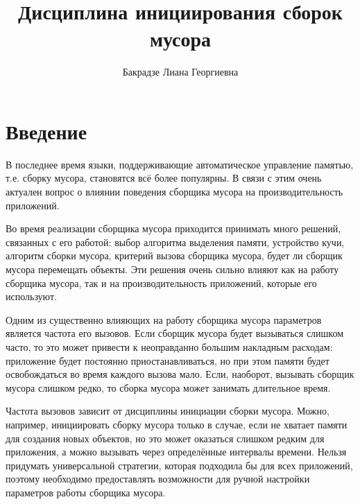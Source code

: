 \title{Дисциплина инициирования сборок мусора}
%
\author{Бакрадзе Лиана Георгиевна}
%
%

%
%

\maketitle              %

\begin{abstract}
\end{abstract}
%

\section*{Введение}

В последнее время языки, поддерживающие автоматическое управление памятью, т.е. сборку 
мусора, становятся всё более популярны. В связи с этим очень актуален вопрос о влиянии
поведения сборщика мусора на производительность приложений.

Во время реализации сборщика мусора приходится принимать много решений,
связанных с его работой: выбор алгоритма выделения памяти, устройство кучи, 
алгоритм сборки мусора, критерий вызова сборщика мусора, будет ли сборщик мусора 
перемещать объекты. Эти решения очень сильно влияют как на работу сборщика мусора, 
так и на
производительность приложений, которые его используют.

Одним из существенно влияющих на работу сборщика мусора параметров
является частота его вызовов. Если 
сборщик мусора будет вызываться слишком часто, то это может привести к неоправданно
большим накладным расходам: приложение будет постоянно приостанавливаться, но при 
этом памяти будет освобождаться во время каждого вызова мало. Если, наоборот, вызывать 
сборщик мусора слишком редко, то сборка мусора может занимать длительное время. 

Частота вызовов
зависит от дисциплины инициации сборки мусора. Можно, например, инициировать сборку
мусора только в случае, если не хватает памяти для создания новых объектов, но это может 
оказаться слишком редким для приложения, а можно вызывать через определённые интервалы времени.
Нельзя придумать универсальной стратегии, которая подходила бы для всех приложений, поэтому
необходимо
предоставлять возможности для ручной настройки параметров работы сборщика мусора. 

